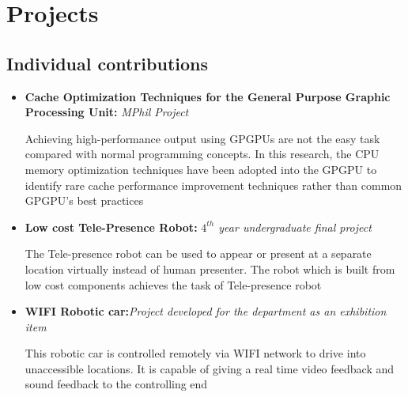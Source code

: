 \documentclass[11pt,a4paper,scan]{moderncv}        %
\begin{document}
%
%  


\section{Projects}

\subsection{Individual contributions}

\vspace{5pt}

\begin{itemize}

\item{\textbf{Cache Optimization Techniques for the General
		Purpose Graphic Processing Unit:} \textit{MPhil Project}

\vspace{3pt}

\small{Achieving high-performance output using GPGPUs are not the easy task compared with normal programming concepts. In this research, the CPU memory optimization techniques have been adopted into the GPGPU to identify rare cache performance improvement techniques rather than common GPGPU’s best practices}}

\vspace{6pt}

\item{\textbf{Low cost Tele-Presence Robot:} \textit{$4^{th}$ year undergraduate final project}

\vspace{3pt}

\small{The Tele-presence robot can be used to appear or present at a separate location virtually instead of human presenter. The robot which is built from low cost components achieves the task of Tele-presence robot}}

\vspace{6pt}


\item{\textbf{WIFI Robotic car:}\textit{Project developed for the department as an exhibition item}

\vspace{3pt}

\small{This robotic car is controlled remotely via WIFI network to drive into unaccessible locations. It is capable of giving a real time video feedback and sound feedback to the controlling end}}

\end{itemize}
\end{document}
